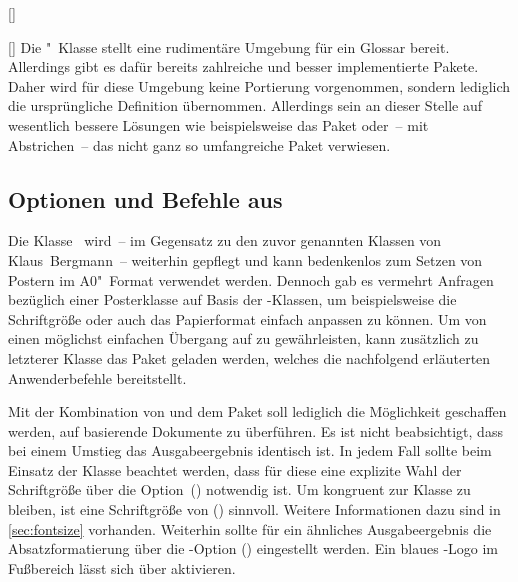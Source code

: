 \begin{Entity*}{}
\begin{Declaration}{[]}
\begin{Declaration}{[]}
\printdeclarationlist%
%
Die "~Klasse stellt eine rudimentäre Umgebung für ein Glossar 
bereit. Allerdings gibt es dafür bereits zahlreiche und besser implementierte 
Pakete. Daher wird für diese Umgebung keine Portierung vorgenommen, sondern 
lediglich die ursprüngliche Definition übernommen. Allerdings sein an dieser 
Stelle auf wesentlich bessere Lösungen wie beispielsweise das Paket 
 oder~-- mit Abstrichen~-- das nicht ganz so umfangreiche 
Paket  verwiesen.
\end{Declaration}
\end{Declaration}
%



\subsection{Optionen und Befehle aus }
%
%
Die Klasse~ wird~-- im Gegensatz zu den zuvor genannten 
Klassen von Klaus~Bergmann~-- weiterhin gepflegt und kann bedenkenlos zum 
Setzen von Postern im A0"~Format verwendet werden. Dennoch gab es vermehrt 
Anfragen bezüglich einer Posterklasse auf Basis der \TUDScript-Klassen, um 
beispielsweise die Schriftgröße oder auch das Papierformat einfach anpassen zu 
können. Um von  einen möglichst einfachen Übergang auf 
 zu gewährleisten, kann zusätzlich zu letzterer Klasse das 
Paket  geladen werden, welches die nachfolgend erläuterten 
Anwenderbefehle bereitstellt.

Mit der Kombination von  und dem Paket 
soll lediglich die Möglichkeit geschaffen werden, auf  
basierende Dokumente zu überführen. Es ist nicht beabsichtigt, dass bei einem 
Umstieg das Ausgabeergebnis identisch ist. In jedem Fall sollte beim Einsatz 
der Klasse  beachtet werden, dass für diese eine explizite 
Wahl der Schriftgröße über die Option~() 
notwendig ist. Um kongruent zur Klasse  zu bleiben, ist 
eine Schriftgröße von () 
sinnvoll. Weitere Informationen dazu sind in \autoref{sec:fontsize} vorhanden. 
Weiterhin sollte für ein ähnliches Ausgabeergebnis die Absatzformatierung über 
die \KOMAScript-Option () 
eingestellt werden. Ein blaues \DDC-Logo im Fußbereich lässt sich über 
 aktivieren.


\end{Entity*}
